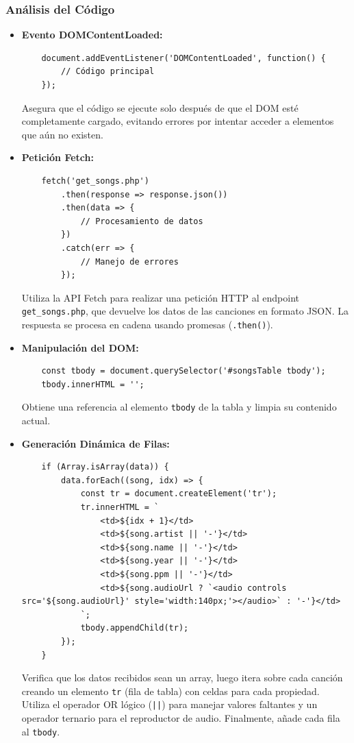 \documentclass[a4paper,12pt]{article}
\begin{document}
\subsubsection{Análisis del Código}
\begin{itemize}
    \item \textbf{Evento DOMContentLoaded:}
    \begin{verbatim}
    document.addEventListener('DOMContentLoaded', function() {
        // Código principal
    });
    \end{verbatim}
    Asegura que el código se ejecute solo después de que el DOM esté completamente cargado, evitando errores por intentar acceder a elementos que aún no existen.

    \item \textbf{Petición Fetch:}
    \begin{verbatim}
    fetch('get_songs.php')
        .then(response => response.json())
        .then(data => {
            // Procesamiento de datos
        })
        .catch(err => {
            // Manejo de errores
        });
    \end{verbatim}
    Utiliza la API Fetch para realizar una petición HTTP al endpoint \texttt{get\_songs.php}, que devuelve los datos de las canciones en formato JSON. La respuesta se procesa en cadena usando promesas (\texttt{.then()}).

    \item \textbf{Manipulación del DOM:}
    \begin{verbatim}
    const tbody = document.querySelector('#songsTable tbody');
    tbody.innerHTML = '';
    \end{verbatim}
    Obtiene una referencia al elemento \texttt{tbody} de la tabla y limpia su contenido actual.

    \item \textbf{Generación Dinámica de Filas:}
    \begin{verbatim}
    if (Array.isArray(data)) {
        data.forEach((song, idx) => {
            const tr = document.createElement('tr');
            tr.innerHTML = `
                <td>${idx + 1}</td>
                <td>${song.artist || '-'}</td>
                <td>${song.name || '-'}</td>
                <td>${song.year || '-'}</td>
                <td>${song.ppm || '-'}</td>
                <td>${song.audioUrl ? `<audio controls src='${song.audioUrl}' style='width:140px;'></audio>` : '-'}</td>
            `;
            tbody.appendChild(tr);
        });
    }
    \end{verbatim}
    Verifica que los datos recibidos sean un array, luego itera sobre cada canción creando un elemento \texttt{tr} (fila de tabla) con celdas para cada propiedad. Utiliza el operador OR lógico (\texttt{||}) para manejar valores faltantes y un operador ternario para el reproductor de audio. Finalmente, añade cada fila al \texttt{tbody}.


\end{itemize}
\end{document}
